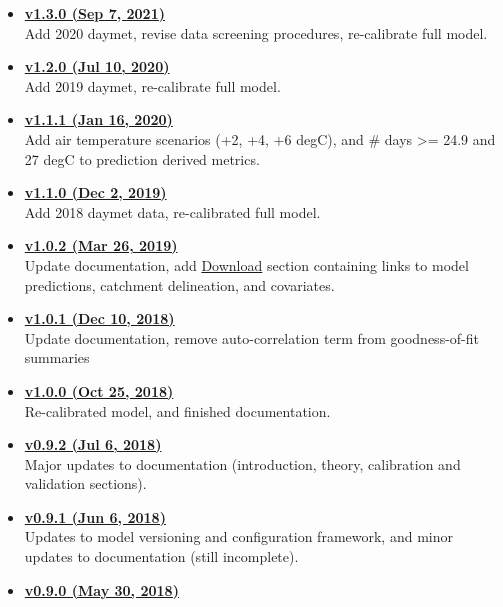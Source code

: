 \documentclass[]{book}
\providecommand{\tightlist}{%
  \setlength{\itemsep}{0pt}\setlength{\parskip}{0pt}}
\begin{document}
\begin{itemize}
\tightlist
\item
  \textbf{\href{https://ecosheds.org/models/stream-temperature/v1.3.0/}{v1.3.0 (Sep 7, 2021)}}\\
  Add 2020 daymet, revise data screening procedures, re-calibrate full model.
\item
  \textbf{\href{https://ecosheds.org/models/stream-temperature/v1.2.0/}{v1.2.0 (Jul 10, 2020)}}\\
  Add 2019 daymet, re-calibrate full model.
\item
  \textbf{\href{https://ecosheds.org/models/stream-temperature/v1.1.1/}{v1.1.1 (Jan 16, 2020)}}\\
  Add air temperature scenarios (+2, +4, +6 degC), and \# days \textgreater{}= 24.9 and 27 degC to prediction derived metrics.
\item
  \textbf{\href{https://ecosheds.org/models/stream-temperature/v1.1.0/}{v1.1.0 (Dec 2, 2019)}}\\
  Add 2018 daymet data, re-calibrated full model.
\item
  \textbf{\href{https://ecosheds.org/models/stream-temperature/v1.0.2/}{v1.0.2 (Mar 26, 2019)}}\\
  Update documentation, add \protect\hyperlink{download}{Download} section containing links to model predictions, catchment delineation, and covariates.
\item
  \textbf{\href{https://ecosheds.org/models/stream-temperature/v1.0.1/}{v1.0.1 (Dec 10, 2018)}}\\
  Update documentation, remove auto-correlation term from goodness-of-fit summaries
\item
  \textbf{\href{https://ecosheds.org/models/stream-temperature/v1.0.0/}{v1.0.0 (Oct 25, 2018)}}\\
  Re-calibrated model, and finished documentation.
\item
  \textbf{\href{https://ecosheds.org/models/stream-temperature/v0.9.2/}{v0.9.2 (Jul 6, 2018)}}\\
  Major updates to documentation (introduction, theory, calibration and validation sections).
\item
  \textbf{\href{https://ecosheds.org/models/stream-temperature/v0.9.1/}{v0.9.1 (Jun 6, 2018)}}\\
  Updates to model versioning and configuration framework, and minor updates to documentation (still incomplete).
\item
  \textbf{\href{https://ecosheds.org/models/stream-temperature/v0.9.0/}{v0.9.0 (May 30, 2018)}}\\

\end{itemize}
\end{document}
